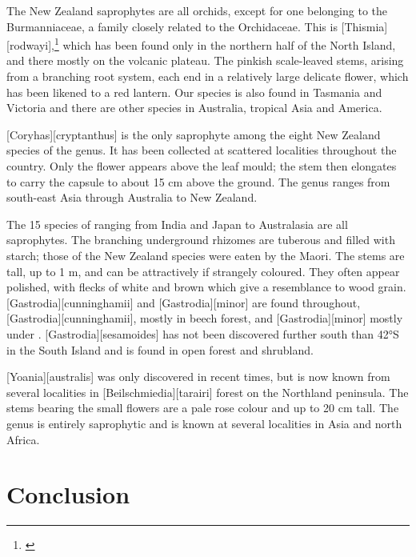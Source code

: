 The New Zealand saprophytes are all orchids, except for one belonging to the Burmanniaceae, a family closely related to the Orchidaceae.
This is [Thismia][rodwayi],\footnote{\cite{campbell1968investigation}} which has been found only in the northern half of the North Island, and there mostly on the volcanic plateau.
The pinkish scale-leaved stems, arising from a branching root system, each end in a relatively large delicate flower, which has been likened to a red lantern.
Our species is also found in Tasmania and Victoria and there are other species in Australia, tropical Asia and America.

[Coryhas][cryptanthus] is the only saprophyte among the eight New Zealand species of the genus.
It has been collected at scattered localities throughout the country.
Only the flower appears above the leaf mould; the stem then elongates to carry the capsule to about 15 cm above the ground.
The genus ranges from south-east Asia through Australia to New Zealand.

The 15 species of  ranging from India and Japan to Australasia are all saprophytes.
The branching underground rhizomes are tuberous and filled with starch; those of the New Zealand species were eaten by the Maori.
The stems are tall, up to 1 m, and can be attractively if strangely coloured.
They often appear polished, with flecks of white and brown which give a resemblance to wood grain. [Gastrodia][cunninghamii] and [Gastrodia][minor] are found throughout, [Gastrodia][cunninghamii], mostly in beech forest, and [Gastrodia][minor] mostly under . [Gastrodia][sesamoides] has not been discovered further south than 42°S in the South Island and is found in open forest and shrubland.

[Yoania][australis] was only discovered in recent times, but is now known from several localities in [Beilschmiedia][tarairi] forest on the Northland peninsula.
The stems bearing the small flowers are a pale rose colour and up to 20 cm tall.
The genus is entirely saprophytic and is known at several localities in Asia and north Africa.

\section{Conclusion}

